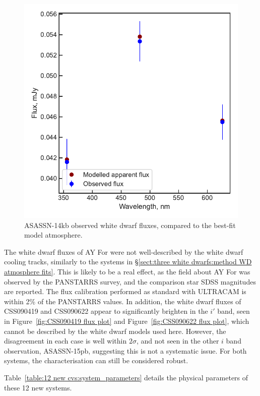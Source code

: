 \begin{figure}
    \centering
    \includegraphics[width=\textwidth]{figures/results/ASASSN-14kb/fluxplot.pdf}
    \caption{ASASSN-14kb observed white dwarf fluxes, compared to the best-fit model atmosphere.}
    \label{fig:results:12 new CVs:ASASSN-14kb flux plot}
\end{figure}

The white dwarf fluxes of AY For were not well-described by the white dwarf cooling tracks, similarly to the systems in \S\ref{sect:three white dwarfs:method WD atmosphere fits}. This is likely to be a real effect, as the field about AY For was observed by the PANSTARRS survey, and the comparison star SDSS magnitudes are reported. The flux calibration performed as standard with ULTRACAM is within 2\% of the PANSTARRS values.
In addition, the white dwarf fluxes of CSS090419 and CSS090622 appear to significantly brighten in the $i'$ band, seen in Figure~\ref{fig:CSS090419 flux plot} and Figure~\ref{fig:CSS090622 flux plot}, which cannot be described by the white dwarf models used here. However, the disagreement in each case is well within $2 \sigma$, and not seen in the other $i$ band observation, ASASSN-15pb, suggesting this is not a systematic issue. For both systems, the characterisation can still be considered robust.

Table~\ref{table:12 new cvs:system_parameters} details the physical parameters of these 12 new systems.

